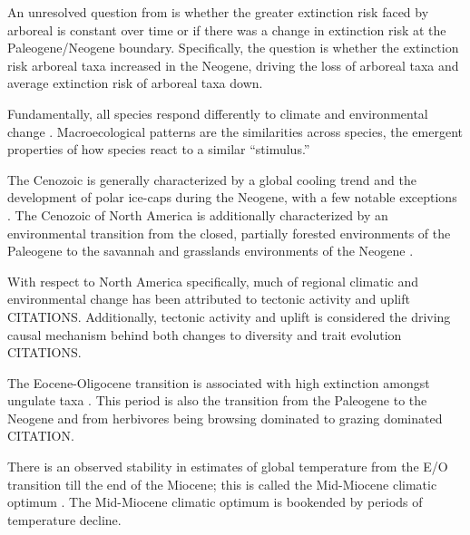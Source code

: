 \documentclass[12pt,letterpaper]{article}
\begin{document}
An unresolved question from \citet{Smits2015b} is whether the greater extinction risk faced by arboreal is constant over time or if there was a change in extinction risk at the Paleogene/Neogene boundary. Specifically, the question is whether the extinction risk arboreal taxa increased in the Neogene, driving the loss of arboreal taxa and average extinction risk of arboreal taxa down. 





Fundamentally, all species respond differently to climate and environmental change \citep{Blois2009}. Macroecological patterns are the similarities across species, the emergent properties of how species react to a similar ``stimulus.''

The Cenozoic is generally characterized by a global cooling trend and the development of polar ice-caps during the Neogene, with a few notable exceptions \citep{Zachos2001,Zachos2008,Cramer2011}. The Cenozoic of North America is additionally characterized by an environmental transition from the closed, partially forested environments of the Paleogene to the savannah and grasslands environments of the Neogene \citep{Blois2009,Janis1993b,Janis2000,Stromberg2005}.

With respect to North America specifically, much of regional climatic and environmental change has been attributed to tectonic activity and uplift \citep{Blois2009,Eronen2015,Janis2008a,Badgley2013} CITATIONS. Additionally, tectonic activity and uplift is considered the driving causal mechanism behind both changes to diversity and trait evolution \citep{Blois2009,Badgley2013} CITATIONS.

The Eocene-Oligocene transition is associated with high extinction amongst ungulate taxa \citep{Janis2008a}. This period is also the transition from the Paleogene to the Neogene and from herbivores being browsing dominated to grazing dominated CITATION.

There is an observed stability in estimates of global temperature from the E/O transition till the end of the Miocene; this is called the Mid-Miocene climatic optimum \citep{Zachos2001,Zachos2008}. The Mid-Miocene climatic optimum is bookended by periods of temperature decline.
\end{document}
